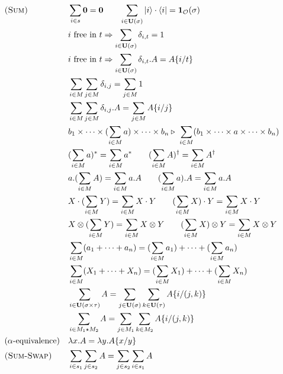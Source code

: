 {\begin{align*}
        & \textsc{(Sum)}
        && \sum_{i \in s} \mathbf{0} = \mathbf{0}
        \qquad 
        \sum_{i \in \mathbf{U}(\sigma)} \ket{i} \cdot \bra{i} = \mathbf{1}_\mathcal{O}(\sigma) \\
        & && i \text{ free in } t \Rightarrow \sum_{i \in \mathbf{U}(\sigma)} \delta_{i, t} = 1 \\
        & && i \text{ free in } t \Rightarrow \sum_{i \in \mathbf{U}(\sigma)} \delta_{i, t}.A = A\{i/t\} \\
        & && \sum_{i \in M} \sum_{j \in M} \delta_{i, j} = \sum_{j \in M} 1 \\
        & && \sum_{i \in M} \sum_{j \in M} \delta_{i, j}.A = \sum_{j \in M} A\{i/j\} \\
        & &&  b_1 \times \cdots \times (\sum_{i \in M} a) \times \cdots \times b_n 
        \triangleright\ \sum_{i \in M} (b_1 \times \cdots \times a \times \cdots \times b_n) \\
        & && (\sum_{i \in M}a)^* = \sum_{i \in M} a^*
        \qquad
        (\sum_{i \in M} A)^\dagger = \sum_{i \in M} A^\dagger \\
        & &&
        a.(\sum_{i \in M} A) = \sum_{i \in M} a.A
        \qquad
        (\sum_{i \in M} a).A = \sum_{i \in M} a.A \\
        & &&
        X \cdot (\sum_{i \in M} Y) = \sum_{i \in M} X \cdot Y
        \qquad
        (\sum_{i \in M} X) \cdot Y = \sum_{i \in M} X \cdot Y \\
        & &&
        X \otimes (\sum_{i \in M} Y) = \sum_{i \in M} X \otimes Y
        \qquad
        (\sum_{i \in M} X) \otimes Y = \sum_{i \in M} X \otimes Y \\
        & && \sum_{i \in M}(a_1 + \cdots + a_n) = (\sum_{i \in M} a_1) + \cdots + (\sum_{i \in M} a_n) \\
        & && \sum_{i \in M}(X_1 + \cdots + X_n) =(\sum_{i \in M} X_1) + \cdots + (\sum_{i \in M} X_n) \\
        & && \sum_{i \in \mathbf{U}(\sigma \times \tau)} A =\sum_{j \in \mathbf{U}(\sigma)} \sum_{k \in \mathbf{U}(\tau)} A\{i/(j, k)\} \\
        & && \sum_{i \in M_1 \star M_2} A =\sum_{j \in M_1} \sum_{k \in M_2} A\{i/(j, k)\} \\
        & \textrm{($\alpha$-equivalence)}
        && \lambda x . A = \lambda y . A\{x/y\} \\
        & \textsc{(Sum-Swap)}
        && \sum_{i \in s_1} \sum_{j \in s_2} A = \sum_{j \in s_2} \sum_{i \in s_1} A
    \end{align*}
}



